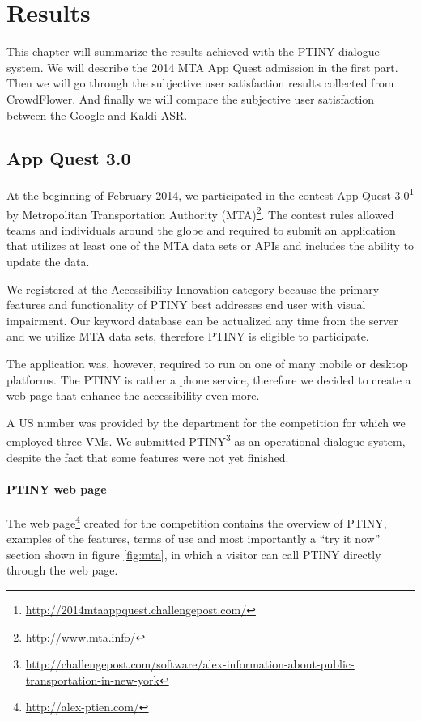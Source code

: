 \chapter{Results}

This chapter will summarize the results achieved with the PTINY dialogue system.
We will describe the 2014 MTA App Quest admission in the first part.
Then we will go through the subjective user satisfaction results collected from CrowdFlower.
And finally we will compare the subjective user satisfaction between the Google and Kaldi ASR.

\section{App Quest 3.0}

At the beginning of February 2014, we participated in the contest App Quest 3.0\footnote{\url{http://2014mtaappquest.challengepost.com/}} by Metropolitan Transportation Authority (MTA)\footnote{\url{http://www.mta.info/}}.
The contest rules allowed teams and individuals around the globe and required to submit an application that utilizes at least one of the MTA data sets or APIs and includes the ability to update the data.

We registered at the Accessibility Innovation category because the primary features and functionality of PTINY best addresses end user with visual impairment.
Our keyword database can be actualized any time from the server and we utilize MTA data sets, therefore PTINY is eligible to participate.

The application was, however, required to run on one of many mobile or desktop platforms.
The PTINY is rather a phone service, therefore we decided to create a web page that enhance the accessibility even more.

A US number was provided by the department for the competition for which we employed three VMs.
We submitted PTINY\footnote{\url{http://challengepost.com/software/alex-information-about-public-transportation-in-new-york}} as an operational dialogue system, despite the fact that some features were not yet finished.

\subsubsection{PTINY web page}

The web page\footnote{\url{http://alex-ptien.com/}} created for the competition contains the overview of PTINY, examples of the features, terms of use and most importantly a ``try it now'' section shown in figure \ref{fig:mta}, in which a visitor can call PTINY directly through the web page.

